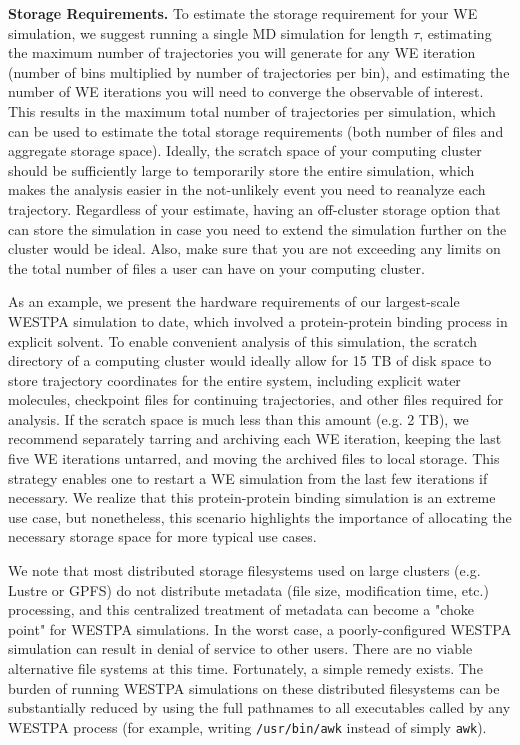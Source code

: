 \documentclass[9pt,tutorial]{livecoms}
\begin{document}
\textbf{Storage Requirements.} To estimate the storage requirement for your WE simulation, we suggest running a single MD simulation for length $\tau$, estimating the maximum number of trajectories you will generate for any WE iteration (number of bins multiplied by number of trajectories per bin), and estimating the number of WE iterations you will need to converge the observable of interest. 
This results in the maximum total number of trajectories per simulation, which can be used to estimate the total storage requirements (both number of files and aggregate storage space). 
Ideally, the scratch space of your computing cluster should be sufficiently large to temporarily store the entire simulation, which makes the analysis easier in the not-unlikely event you need to reanalyze each trajectory. 
Regardless of your estimate, having an off-cluster storage option that can store the simulation in case you need to extend the simulation further on the cluster would be ideal. 
Also, make sure that you are not exceeding any limits on the total number of files a user can have on your computing cluster. 

As an example, we present the hardware requirements of our largest-scale WESTPA simulation to date, which involved a protein-protein binding process in explicit solvent. 
To enable convenient analysis of this simulation, the scratch directory of a computing cluster would ideally allow for 15 TB of disk space to store trajectory coordinates for the entire system, including explicit water molecules, checkpoint files for continuing trajectories, and other files required for analysis. 
If the scratch space is much less than this amount (e.g. 2 TB), we recommend separately tarring and archiving each WE iteration, keeping the last five WE iterations untarred, and moving the archived files to local storage. 
This strategy enables one to restart a WE simulation from the last few iterations if necessary. 
We realize that this protein-protein binding simulation is an extreme use case, but nonetheless, this scenario highlights the importance of allocating the necessary storage space for more typical use cases. 

We note that most distributed storage filesystems used on large clusters (e.g. Lustre or GPFS) do not distribute metadata (file size, modification time, etc.) processing, and this centralized treatment of metadata can become a "choke point" for WESTPA simulations. 
In the worst case, a poorly-configured WESTPA simulation can result in denial of service to other users. 
There are no viable alternative file systems at this time. 
Fortunately, a simple remedy exists. The burden of running WESTPA simulations on these distributed filesystems can be substantially reduced by using the full pathnames to all executables called by any WESTPA process (for example, writing \verb|/usr/bin/awk| instead of simply \verb|awk|).
\end{document}

